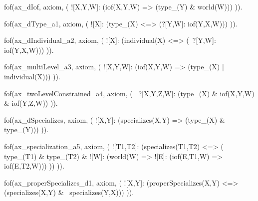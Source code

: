 fof(ax_dIof, axiom, (
  ![X,Y,W]: (iof(X,Y,W) => (type_(Y) & world(W)))
)).

fof(ax_dType_a1, axiom, (
  ![X]: (type_(X) <=> (?[Y,W]: iof(Y,X,W)))
)).

fof(ax_dIndividual_a2, axiom, (
  ![X]: (individual(X) <=> (~?[Y,W]: iof(Y,X,W)))
)).


fof(ax_multiLevel_a3, axiom, (
  ![X,Y,W]: (iof(X,Y,W) => (type_(X) | individual(X)))
)).

fof(ax_twoLevelConstrained_a4, axiom, (
  ~?[X,Y,Z,W]: (type_(X) & iof(X,Y,W) & iof(Y,Z,W))
)).








fof(ax_dSpecializes, axiom, (
  ![X,Y]: (specializes(X,Y) => (type_(X) & type_(Y)))
)).

fof(ax_specialization_a5, axiom, (
  ![T1,T2]: (specializes(T1,T2) <=> (
    type_(T1) & type_(T2) & ![W]: (world(W) => ![E]: (iof(E,T1,W) => iof(E,T2,W)))
  ))
)).

fof(ax_properSpecializes_d1, axiom, (
  ![X,Y]: (properSpecializes(X,Y) <=> (specializes(X,Y) & ~specializes(Y,X)))
)).





